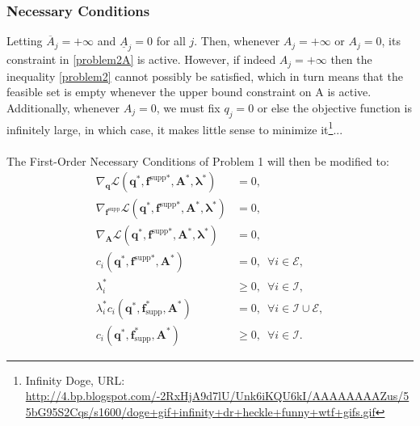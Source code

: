 \documentclass[10pt,a4paper]{article}
\begin{document}
\subsubsection{Necessary Conditions}
Letting $\overline{A}_j = +\infty$ and $\underline{A}_j = 0$ for all $j$. Then, whenever $A_j = +\infty$ or $A_j = 0$, its constraint in \eqref{problem2A} is active. However, if indeed $A_j = +\infty$ then the inequality \eqref{problem2} cannot possibly be satisfied, which in turn means that the feasible set is empty whenever the upper bound constraint on A is active. Additionally, whenever $A_j = 0$, we must fix $q_j = 0$ or else the objective function is infinitely large, in which case, it makes little sense to minimize it\footnote{Infinity Doge, URL: \url{http://4.bp.blogspot.com/-2RxHjA9d7lU/Unk6iKQU6kI/AAAAAAAAZus/55bG95S2Cqs/s1600/doge+gif+infinity+dr+heckle+funny+wtf+gifs.gif}}...
\\\\
The First-Order Necessary Conditions of Problem 1 will then be modified to:
\begin{align}\label{additionalgay}
\nabla_{\boldsymbol{q}}\mathcal{L}\left(\boldsymbol{q}^*,\boldsymbol{f}^\text{supp*},\boldsymbol{A}^*,\boldsymbol{\lambda}^*\right) &= 0, \\
\nabla_{\boldsymbol{f}^\text{supp}}\mathcal{L}\left(\boldsymbol{q}^*,\boldsymbol{f}^\text{supp*},\boldsymbol{A}^*,\boldsymbol{\lambda}^*\right) &= 0,\\
\nabla_{\boldsymbol{A}}\mathcal{L}\left(\boldsymbol{q}^*,\boldsymbol{f}^\text{supp*},\boldsymbol{A}^*,\boldsymbol{\lambda}^*\right) &= 0, \\
c_i\left(\boldsymbol{q}^*,\boldsymbol{f}^\text{supp*},\boldsymbol{A}^*\right) &= 0, \enspace \forall i \in \mathcal{E},\\
\lambda_i^* &\geq 0, \enspace \forall i\in\mathcal{I},\\
\lambda_i^* c_i(\boldsymbol{q}^*,\boldsymbol{f}_\text{supp}^*,\boldsymbol{A}^*) &= 0, \enspace \forall i\in\mathcal{I}\cup\mathcal{E},\\
c_i(\boldsymbol{q}^*,\boldsymbol{f}_\text{supp}^*,\boldsymbol{A}^*) &\geq 0, \enspace \forall i\in\mathcal{I}.\label{finalgay}
\end{align}
\newpage \noindent
\end{document}
